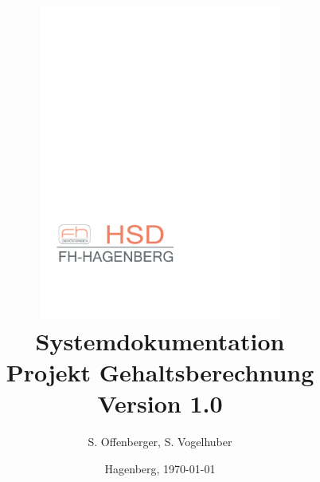 \documentclass[12pt,naustrian,a4widepaper]{scrartcl}
\begin{document}

\title {\vspace{1cm}
       \includegraphics[width=8cm]{./Images/FhOOeLogoOkt2009_HSD_Rot_pastell}\\
       \vspace{2cm}
       {\textbf{Systemdokumentation\\Projekt Gehaltsberechnung}}\\
       \vspace{5mm}
       {\small{Version 1.0}}\\
       \vspace{5mm}
}

\author{\small{S. Offenberger, S. Vogelhuber}}
\date  {\small{Hagenberg, \today}}
\maketitle


\clearpage

\tableofcontents
\clearpage
\end{document}
